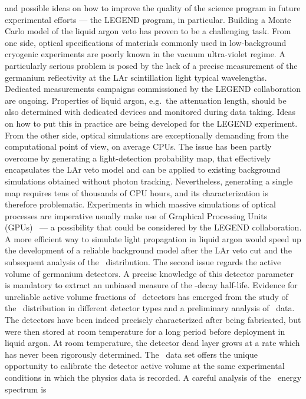 and possible ideas on how to improve the quality of the science program in future
experimental efforts --- the LEGEND program, in particular. Building a Monte Carlo model
of the liquid argon veto has proven to be a challenging task. From one side, optical
specifications of materials commonly used in low-background cryogenic experiments are
poorly known in the vacuum ultra-violet regime. A particularly serious problem is posed by
the lack of a precise measurement of the germanium reflectivity at the LAr scintillation
light typical wavelengths. Dedicated measurements campaigns commissioned by the LEGEND
collaboration are ongoing.  Properties of liquid argon, e.g.~the attenuation length,
should be also determined with dedicated devices and monitored during data taking. Ideas
on how to put this in practice are being developed for the LEGEND experiment. From the
other side, optical simulations are exceptionally demanding from the computational point
of view, on average CPUs. The issue has been partly overcome by generating a
light-detection probability map, that effectively encapsulates the LAr veto model and can
be applied to existing background simulations obtained without photon tracking.
Nevertheless, generating a single map requires tens of thousands of CPU hours, and its
characterization is therefore problematic. Experiments in which massive simulations of
optical processes are imperative usually make use of Graphical Processing Units
(GPUs)~\cite{Merck2012, Blyth2019} --- a possibility that could be considered by the
LEGEND collaboration. A more efficient way to simulate light propagation in liquid argon
would speed up the development of a reliable background model after the LAr veto cut and
the subsequent analysis of the \nnbb\ distribution.
\newpar
The second issue regards the active volume of germanium detectors. A precise knowledge of
this detector parameter is mandatory to extract an unbiased measure of the \nnbb-decay
half-life. Evidence for unreliable active volume fractions of \bege\ detectors has emerged
from the study of the \nnbb\ distribution in different detector types and a preliminary
analysis of \Arl\ data.  The detectors have been indeed precisely characterized after
being fabricated, but were then stored at room temperature for a long period before
deployment in liquid argon. At room temperature, the detector dead layer grows at a rate
which has never been rigorously determined. The \Arl\ data set offers the unique
opportunity to calibrate the detector active volume at the same experimental conditions in
which the physics data is recorded. A careful analysis of the \Arl\ energy spectrum is
